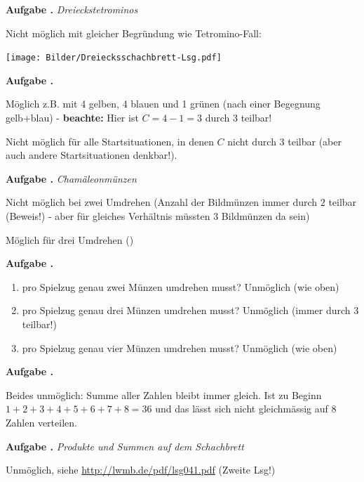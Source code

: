\documentclass[a4paper,ngerman,12pt]{scrartcl}
\theoremstyle{definition}
\theoremstyle{plain}
\theoremstyle{remark}
\newlength{\aufgabenskip}
\newcounter{aufgabennummer}
\newenvironment{aufgabe}[1]{
	\addtocounter{aufgabennummer}{1}
	\textbf{Aufgabe \theaufgabennummer.} \emph{#1} \par
}{\vspace{\aufgabenskip}}
\begin{document}
\begin{aufgabe}{Dreieckstetrominos}
	Nicht möglich mit gleicher Begründung wie Tetromino-Fall:
	\begin{center}
		\texttt{[image: Bilder/Dreiecksschachbrett-Lsg.pdf]}
	\end{center}
\end{aufgabe}

\begin{aufgabe}{}
	Möglich z.B. mit 4 gelben, 4 blauen und 1 grünen (nach einer Begegnung gelb+blau) - \textbf{beachte:} Hier ist $C = 4 - 1 = 3$ durch 3 teilbar!
	
	Nicht möglich für alle Startsituationen, in denen $C$ nicht durch $3$ teilbar (aber auch andere Startsituationen denkbar!).
\end{aufgabe}

\begin{aufgabe}{Chamäleonmünzen}
	Nicht möglich bei zwei Umdrehen (Anzahl der Bildmünzen immer durch $2$ teilbar (Beweis!) - aber für gleiches Verhältnis müssten 3 Bildmünzen da sein)
	
	Möglich für drei Umdrehen ()
\end{aufgabe}

\begin{aufgabe}{}
	\begin{enumerate}
		\item pro Spielzug genau zwei Münzen umdrehen musst? Unmöglich (wie oben)
		\item pro Spielzug genau drei Münzen umdrehen musst? Unmöglich (immer durch 3 teilbar!)
		\item pro Spielzug genau vier Münzen umdrehen musst? Unmöglich (wie oben)
	\end{enumerate}
\end{aufgabe}

\begin{aufgabe}{}
Beides unmöglich: Summe aller Zahlen bleibt immer gleich. Ist zu Beginn $1+2+3+4+5+6+7+8=36$ und das lässt sich nicht gleichmässig auf $8$ Zahlen verteilen.
\end{aufgabe}

\begin{aufgabe}{Produkte und Summen auf dem Schachbrett}
	Unmöglich, siehe \url{http://lwmb.de/pdf/lsg041.pdf} (Zweite Lsg!)
\end{aufgabe}
\end{document}
